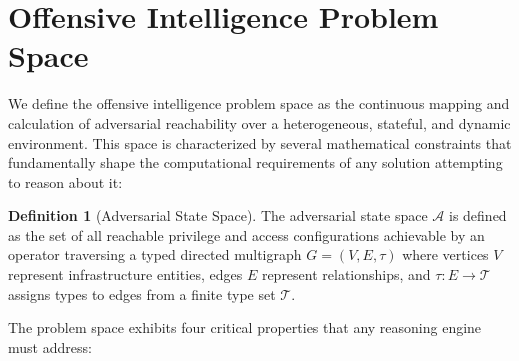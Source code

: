 \documentclass[11pt,a4paper]{article}
\theoremstyle{definition}
\newtheorem{definition}{Definition}[section]
\numberwithin{equation}{section}
\newcommand{\set}[1]{\mathcal{#1}}
\begin{document}
\section{Offensive Intelligence Problem Space}\label{sec:problem}

We define the offensive intelligence problem space as the continuous mapping and calculation of adversarial reachability over a heterogeneous, stateful, and dynamic environment. This space is characterized by several mathematical constraints that fundamentally shape the computational requirements of any solution attempting to reason about it:

\begin{definition}[Adversarial State Space]
The adversarial state space $\set{A}$ is defined as the set of all reachable privilege and access configurations achievable by an operator traversing a typed directed multigraph $G = (V, E, \tau)$ where vertices $V$ represent infrastructure entities, edges $E$ represent relationships, and $\tau: E \to \mathcal{T}$ assigns types to edges from a finite type set $\mathcal{T}$.
\end{definition}

The problem space exhibits four critical properties that any reasoning engine must address:
\end{document}
